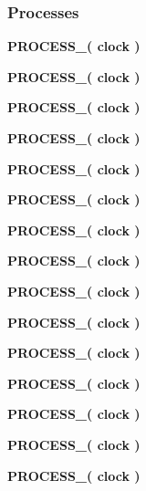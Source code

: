 \subsubsection*{Processes}
 \begin{DoxyCompactItemize}
\item 
{\bf P\+R\+O\+C\+E\+S\+S\+\_}{\bfseries  ( {\bfseries {\bfseries {\bf clock}} \textcolor{vhdlchar}{ }} )}
\item 
{\bf P\+R\+O\+C\+E\+S\+S\+\_}{\bfseries  ( {\bfseries {\bfseries {\bf clock}} \textcolor{vhdlchar}{ }} )}
\item 
{\bf P\+R\+O\+C\+E\+S\+S\+\_}{\bfseries  ( {\bfseries {\bfseries {\bf clock}} \textcolor{vhdlchar}{ }} )}
\item 
{\bf P\+R\+O\+C\+E\+S\+S\+\_}{\bfseries  ( {\bfseries {\bfseries {\bf clock}} \textcolor{vhdlchar}{ }} )}
\item 
{\bf P\+R\+O\+C\+E\+S\+S\+\_}{\bfseries  ( {\bfseries {\bfseries {\bf clock}} \textcolor{vhdlchar}{ }} )}
\item 
{\bf P\+R\+O\+C\+E\+S\+S\+\_}{\bfseries  ( {\bfseries {\bfseries {\bf clock}} \textcolor{vhdlchar}{ }} )}
\item 
{\bf P\+R\+O\+C\+E\+S\+S\+\_}{\bfseries  ( {\bfseries {\bfseries {\bf clock}} \textcolor{vhdlchar}{ }} )}
\item 
{\bf P\+R\+O\+C\+E\+S\+S\+\_}{\bfseries  ( {\bfseries {\bfseries {\bf clock}} \textcolor{vhdlchar}{ }} )}
\item 
{\bf P\+R\+O\+C\+E\+S\+S\+\_}{\bfseries  ( {\bfseries {\bfseries {\bf clock}} \textcolor{vhdlchar}{ }} )}
\item 
{\bf P\+R\+O\+C\+E\+S\+S\+\_}{\bfseries  ( {\bfseries {\bfseries {\bf clock}} \textcolor{vhdlchar}{ }} )}
\item 
{\bf P\+R\+O\+C\+E\+S\+S\+\_}{\bfseries  ( {\bfseries {\bfseries {\bf clock}} \textcolor{vhdlchar}{ }} )}
\item 
{\bf P\+R\+O\+C\+E\+S\+S\+\_}{\bfseries  ( {\bfseries {\bfseries {\bf clock}} \textcolor{vhdlchar}{ }} )}
\item 
{\bf P\+R\+O\+C\+E\+S\+S\+\_}{\bfseries  ( {\bfseries {\bfseries {\bf clock}} \textcolor{vhdlchar}{ }} )}
\item 
{\bf P\+R\+O\+C\+E\+S\+S\+\_}{\bfseries  ( {\bfseries {\bfseries {\bf clock}} \textcolor{vhdlchar}{ }} )}
\item 
{\bf P\+R\+O\+C\+E\+S\+S\+\_}{\bfseries  ( {\bfseries {\bfseries {\bf clock}} \textcolor{vhdlchar}{ }} )}

\end{DoxyCompactItemize}
